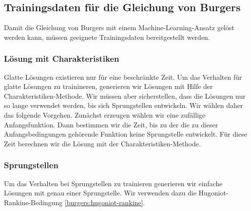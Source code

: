 %
%
%
\subsection{Trainingsdaten für die Gleichung von Burgers\label{burgers:training}}
Damit die Gleichung von Burgers mit einem Machine-Learning-Ansatz gelöst
werden kann, müssen geeignete Trainingsdaten bereitgestellt werden.


\subsubsection{Lösung mit Charakteristiken}
Glatte Lösungen existieren nur für eine beschränkte Zeit.
Um das Verhalten für glatte Lösungen zu trainineren, generieren
wir Lösungen mit Hilfe der Charakteristiken-Methode.
Wir müssen aber sicherstellen, dass die Lösungen nur so lange verwendet
werden, bis sich Sprungstellen entwickeln.
Wir wählen daher das folgende Vorgehen.
Zunächst erzeugen wählen wir eine zufällige Anfangsfunktion.
Dann bestimmen wir die Zeit, bis zu der die zu dieser Anfangsbedingungen
gehörende Funktion keine Sprungstelle entwickelt.
Für diese Zeit berechnen wir die Lösung mit der Charakteristiken-Methode.

\subsubsection{Sprungstellen}
Um das Verhalten bei Sprungstellen zu trainieren generieren wir
einfache Lösungen mit genau einer Sprungstelle.
Wir verwenden dazu die Hugoniot-Rankine-Bedingung \eqref{burgers:hugoniot-rankine}.





